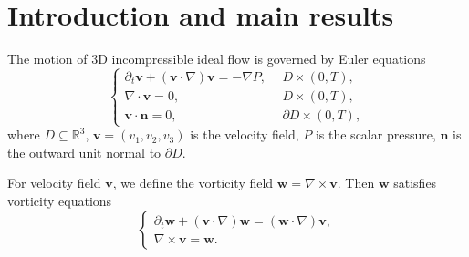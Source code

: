 \documentclass[12pt,reqno]{amsart}
\numberwithin{equation}{section}
\theoremstyle{definition}
\theoremstyle{remark}
\begin{document}
\begin{abstract}
\textbf{Keywords:} Incompressible Euler equation;  Helical symmetry; Semilinear elliptic equations; Clustered solution; Lyapunov-Schmidt reduction method.

\vspace{0.3cm}
\textbf{MSC:} Primary 76B47\,\,\,\,\,\,\,\,Secondary 76B03, 35A02, 35Q31
\end{abstract}
	
	
\maketitle

\section{Introduction and main results}
The motion of 3D incompressible ideal flow is governed by   Euler
equations
\begin{equation}\label{Euler eq}
\begin{cases}
\partial_t\mathbf{v}+(\mathbf{v}\cdot \nabla)\mathbf{v}=-\nabla P,\ \ &D\times (0,T),\\
\nabla\cdot \mathbf{v}=0,\ \ &D\times (0,T),\\
\mathbf{v}\cdot \mathbf{n}=0,\ \ &\partial D\times (0,T),
\end{cases}
\end{equation}
where $ D\subseteq \mathbb{R}^3 $, $ \mathbf{v}=(v_1,v_2,v_3) $ is the velocity field, $ P$ is the scalar pressure, $ \mathbf{n} $ is the outward unit normal to $ \partial D $. %

For velocity field $\mathbf{v}$, we define the  vorticity field $ \mathbf{w}=\nabla\times \mathbf{v} $.  Then $ \mathbf{w} $ satisfies vorticity equations  
\begin{equation}\label{Euler eq2}
\begin{cases}
\partial_t\mathbf{w}+(\mathbf{v}\cdot \nabla)\mathbf{w}=(\mathbf{w}\cdot \nabla)\mathbf{v},\\
\nabla\times \mathbf{v}=\mathbf{w}.
\end{cases}
\end{equation}
\end{document}
